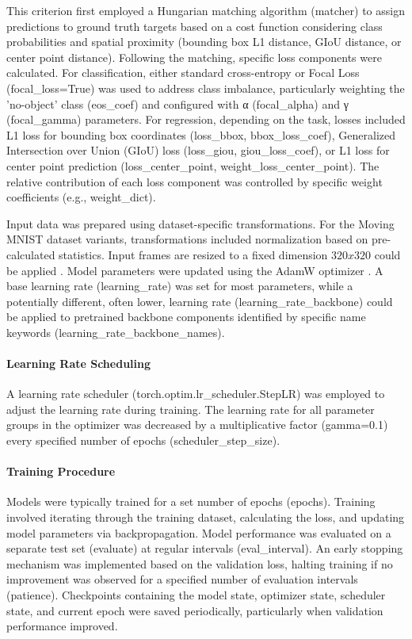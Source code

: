 \begin{itemize}
This criterion first employed a Hungarian matching algorithm (matcher) to assign predictions to ground truth targets based on a cost function considering class probabilities and spatial proximity (bounding box L1 distance, GIoU distance, or center point distance). Following the matching, specific loss components were calculated. For classification, either standard cross-entropy or Focal Loss (focal_loss=True) was used to address class imbalance, particularly weighting the 'no-object' class (eos_coef) and configured with α (focal_alpha) and γ (focal_gamma) parameters. For regression, depending on the task, losses included L1 loss for bounding box coordinates (loss_bbox, bbox_loss_coef), Generalized Intersection over Union (GIoU) loss (loss_giou, giou_loss_coef), or L1 loss for center point prediction (loss_center_point, weight_loss_center_point). The relative contribution of each loss component was controlled by specific weight coefficients (e.g., weight_dict).

Input data was prepared using dataset-specific transformations. For the Moving MNIST dataset variants, transformations included normalization based on pre-calculated statistics. Input frames are resized to a fixed dimension $320x320$ could be applied \cite{}. Model parameters were updated using the AdamW optimizer \cite{}. A base learning rate (learning_rate) was set for most parameters, while a potentially different, often lower, learning rate (learning_rate_backbone) could be applied to pretrained backbone components identified by specific name keywords (learning_rate_backbone_names).

\paragraph{Learning Rate Scheduling}
A learning rate scheduler (torch.optim.lr_scheduler.StepLR) was employed to adjust the learning rate during training. The learning rate for all parameter groups in the optimizer was decreased by a multiplicative factor (gamma=0.1) every specified number of epochs (scheduler_step_size).

\paragraph{Training Procedure}
Models were typically trained for a set number of epochs (epochs). Training involved iterating through the training dataset, calculating the loss, and updating model parameters via backpropagation. Model performance was evaluated on a separate test set (evaluate) at regular intervals (eval_interval). An early stopping mechanism was implemented based on the validation loss, halting training if no improvement was observed for a specified number of evaluation intervals (patience). Checkpoints containing the model state, optimizer state, scheduler state, and current epoch were saved periodically, particularly when validation performance improved.


\end{itemize}
